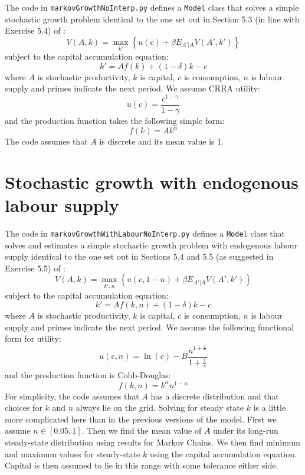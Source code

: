 \documentclass[12pt]{article}
\begin{document}
The code in \texttt{markovGrowthNoInterp.py} defines a \texttt{Model} class that solves a simple stochastic growth problem identical to the one set out in Section 5.3 (in line with Exercise 5.4) of \citet{adda2003dynamic}:
\begin{equation}
	V(A, k) = \max_{k'} \left\{ u(c) + \beta E_{A' | A} V(A', k') \right\}
\end{equation}
subject to the capital accumulation equation:
\begin{equation}
	k' = Af(k) + (1 - \delta)k - c
\end{equation}
where \(A\) is stochastic productivity, \(k\) is capital, \(c\) is consumption, \(n\) is labour supply and primes indicate the next period. We assume CRRA utility:
\begin{equation}
	u(c) = \frac{c^{1 - \gamma}}{1 - \gamma}
\end{equation}
and the production function takes the following simple form:
\begin{equation}
	f(k) = A k^{\alpha}
\end{equation}
The code assumes that \(A\) is discrete and its mean value is 1.

\section{Stochastic growth with endogenous labour supply}

The code in \texttt{markovGrowthWithLabourNoInterp.py} defines a \texttt{Model} class that solves and estimates a simple stochastic growth problem with endogenous labour supply identical to the one set out in Sections 5.4 and 5.5 (as suggested in Exercise 5.5) of \citet{adda2003dynamic}:
\begin{equation}
	V(A, k) = \max_{k', n} \left\{ u(c, 1-n) + \beta E_{A' | A} V(A', k') \right\}
\end{equation}
subject to the capital accumulation equation:
\begin{equation}
	k' = Af(k, n) + (1 - \delta)k - c
\end{equation}
where \(A\) is stochastic productivity, \(k\) is capital, \(c\) is consumption, \(n\) is labour supply and primes indicate the next period. We assume the following functional form for utility:
\begin{equation}
	u(c, n) = \ln(c) - B \frac{n^{1 + \frac{1}{\gamma}}}{1 + \frac{1}{\gamma}}
\end{equation}
and the production function is Cobb-Douglas:
\begin{equation}
	f(k, n) = k^{\alpha} n^{1 - \alpha}
\end{equation}
%
For simplicity, the code assumes that \(A\) has a discrete distribution and that choices for \(k\) and \(n\) always lie on the grid. Solving for steady state \(k\) is a little more complicated here than in the previous versions of the model. First we assume \(n \in [0.05, 1]\). Then we find the mean value of \(A\) under its long-run steady-state distribution using results for Markov Chains. We then find minimum and maximum values for steady-state \(k\) using the capital accumulation equation. Capital is then assumed to lie in this range with some tolerance either side.
\end{document}
